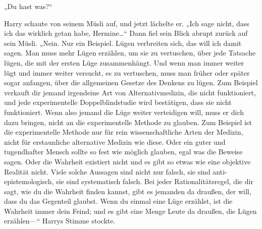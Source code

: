 {„Du hast was?“

Harry schaute von seinem Müsli auf, und jetzt lächelte er. „Ich sage nicht, dass ich das wirklich getan habe, Hermine…“ Dann fiel sein Blick abrupt zurück auf sein Müsli. „Nein. Nur ein Beispiel. Lügen verbreiten sich, das will ich damit sagen. Man muss mehr Lügen erzählen, um sie zu vertuschen, über jede Tatsache lügen, die mit der ersten Lüge zusammenhängt. Und wenn man immer weiter lügt und immer weiter versucht, es zu vertuschen, muss man früher oder später sogar anfangen, über die allgemeinen Gesetze des Denkens zu lügen. Zum Beispiel verkauft dir jemand irgendeine Art von Alternativmedizin, die nicht funktioniert, und jede experimentelle Doppelblindstudie wird bestätigen, dass sie nicht funktioniert. Wenn also jemand die Lüge weiter verteidigen will, muss er dich dazu bringen, nicht an die experimentelle Methode zu glauben. Zum Beispiel ist die experimentelle Methode nur für rein wissenschaftliche Arten der Medizin, nicht für erstaunliche alternative Medizin wie diese. Oder ein guter und tugendhafter Mensch sollte so fest wie möglich glauben, egal was die Beweise sagen. Oder die Wahrheit existiert nicht und es gibt so etwas wie eine objektive Realität nicht. Viele solche Aussagen sind nicht nur falsch, sie sind anti-epistemologisch, sie sind systematisch falsch. Bei jeder Rationalitätsregel, die dir sagt, wie du die Wahrheit finden kannst, gibt es jemanden da draußen, der will, dass du das Gegenteil glaubst. Wenn du einmal eine Lüge erzählst, ist die Wahrheit immer dein Feind; und es gibt eine Menge Leute da draußen, die Lügen erzählen—“ Harrys Stimme stockte.

}
